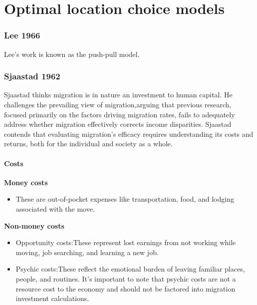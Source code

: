 \documentclass{article}
\numberwithin{equation}{section} %
\begin{document}
\part{Optimal location choice models}


\section{Lee 1966} %
\label{sec:lee_1966}

Lee's work is known as the push-pull model.





\section{Sjaastad 1962} %
\label{sec:sjaastad_1962}

Sjaastad thinks migration is in nature an investment to human capital. He challenges the prevailing view of migration,arguing that previous research, focused primarily on the factors driving migration rates, fails to adequately address whether migration effectively corrects income disparities. Sjaastad contends that evaluating migration's efficacy requires understanding its costs and returns, both for the individual and society as a whole.

\subsection{Costs} %
\label{sub:costs}
\textbf{Money costs}
\begin{itemize}
  \item These are out-of-pocket expenses like transportation, food, and lodging associated with the move.
\end{itemize}

\textbf{Non-money costs}
\begin{itemize}
  \item Opportunity costs:These represent lost earnings from not working while moving, job searching, and learning a new job.
  \item Psychic costs:These reflect the emotional burden of leaving familiar places, people, and routines. It's important to note that psychic costs are not a resource cost to the economy and should not be factored into migration investment calculations. 
\end{itemize}
\end{document}
